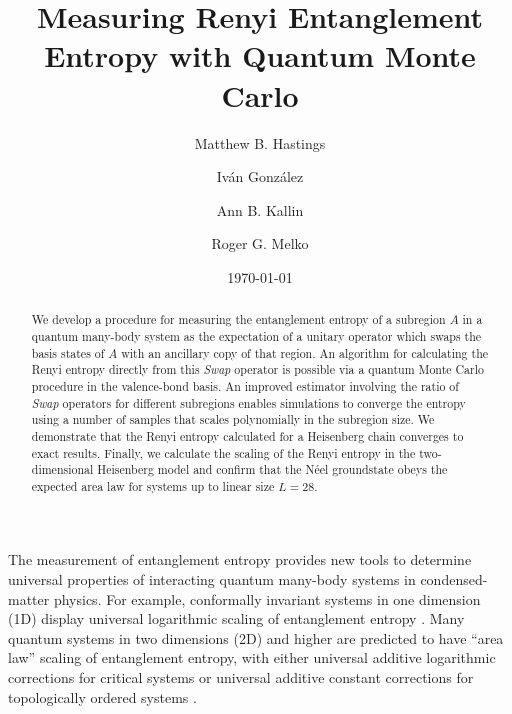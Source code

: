 \documentclass[prl,aps,twocolumn,floatfix,amsmath,amssymb,superscriptaddress,tightenlines]{revtex4}
\begin{document}
\date{\today}
\title{Measuring Renyi Entanglement Entropy with Quantum Monte Carlo}

\author{Matthew B. Hastings}

\author{Iv\'an Gonz\'alez}

\author{Ann B. Kallin}

\author{Roger G. Melko}

\begin{abstract} 
We develop a procedure for measuring the entanglement entropy of a subregion $A$ in a quantum
many-body system
as the expectation of a unitary operator which swaps the 
basis states of $A$ with an ancillary copy of that region.  An algorithm for
calculating the Renyi entropy directly from this {\it Swap} operator
is possible via a quantum Monte Carlo procedure in the valence-bond basis.
An improved estimator involving the ratio of {\it Swap} operators for different subregions enables simulations to converge
the entropy using a number of samples that 
scales polynomially in the subregion size.
We demonstrate that the Renyi entropy calculated for a Heisenberg chain  
converges to exact results. 
Finally, we 
calculate the scaling of the Renyi entropy in the two-dimensional Heisenberg model and confirm that the N\'eel 
groundstate obeys the expected area law for systems up to linear size $L=28$.
\end{abstract}
\maketitle

The measurement of entanglement entropy  provides
new tools to determine universal properties of interacting quantum many-body systems in condensed-matter physics.  For example, conformally invariant
systems in one dimension (1D) display universal logarithmic
scaling of entanglement entropy \cite{Cardy}.  Many
quantum systems in two dimensions (2D) and higher are predicted to have ``area law''
scaling of entanglement entropy, with
either universal additive logarithmic corrections for critical systems \cite{corner,ryu} or
universal additive constant corrections for topologically ordered systems \cite{KP,LW}.
\end{document}
